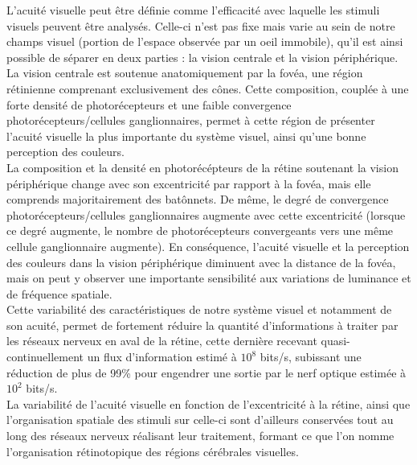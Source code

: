 L'acuité visuelle peut être définie comme l'efficacité  avec laquelle les stimuli visuels peuvent être analysés. Celle-ci n'est pas fixe mais varie au sein de notre champs visuel (portion de l'espace observée par un oeil immobile), qu'il est ainsi possible de séparer en deux parties : la vision centrale et la vision périphérique.\autocite{Werner2014} \\
La vision centrale est soutenue anatomiquement par la fovéa, une région rétinienne comprenant exclusivement des cônes. Cette composition, couplée à une forte densité de photorécepteurs et une faible convergence photorécepteurs/cellules ganglionnaires, permet à cette région de présenter l'acuité visuelle la plus importante du système visuel, ainsi qu'une bonne perception des couleurs. \autocite{Werner2014} \\
La composition et la densité en photorécépteurs de la rétine soutenant la vision périphérique change avec son excentricité par rapport à la fovéa, mais elle comprends majoritairement des batônnets. 
De même, le degré de convergence photorécepteurs/cellules ganglionnaires augmente avec cette excentricité (lorsque ce degré augmente, le nombre de photorécepteurs convergeants vers une même cellule ganglionnaire augmente).
En conséquence, l'acuité visuelle et la perception des couleurs dans la vision périphérique diminuent avec la distance de la fovéa, mais on peut y observer une importante sensibilité aux variations de luminance et de fréquence spatiale. \autocite{Werner2014} \\
Cette variabilité des caractéristiques de notre système visuel et notamment de son acuité, permet de fortement réduire la quantité d'informations à traiter par les réseaux nerveux en aval de la rétine, cette dernière recevant quasi-continuellement un flux d'information estimé à $10^{8}$ bits/s, subissant une réduction de plus de 99\% pour engendrer une sortie par le nerf optique estimée à $10^{2}$ bits/s. \autocite{Kortum1996, Werner2014, Zhaoping2014} \\
La variabilité de l'acuité visuelle en fonction de l'excentricité à la rétine, ainsi que l'organisation spatiale des stimuli sur celle-ci sont d'ailleurs conservées tout au long des réseaux nerveux réalisant leur traitement, formant ce que l'on nomme l'organisation rétinotopique des régions cérébrales visuelles. \autocite{Werner2014} \\

